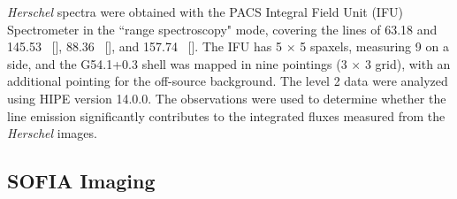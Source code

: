 \documentclass{emulateapj}
\newcommand{\spitzer}{\textit{Spitzer }}
\newcommand{\herschel}{\textit{Herschel }}
\begin{document}
\herschel spectra were obtained with the PACS Integral Field Unit (IFU) Spectrometer \citep{poglitsch10} in the ``range spectroscopy" mode, covering the lines of 63.18 and 145.53 \micron\ [], 88.36 \micron\ [], and 157.74 \micron\ []. The IFU has 5 $\times$ 5 spaxels, measuring 9 on a side, and the G54.1+0.3 shell was mapped in nine pointings (3 $\times$ 3 grid), with an additional pointing for the off-source background. The level 2 data were analyzed using HIPE version 14.0.0. The observations were used to determine whether the line emission significantly contributes to the integrated fluxes measured from the \herschel images.




\begin{figure*}
\center
{} 
\caption{\label{imgpanel}Imaging observations of the infrared shell in G54.1+0.3, including the AKARI 15 \micron, SOFIA 19.7, 25.3, 31.5, and 34.8 \micron, \spitzer MIPS 24 \micron \citep{temim10}, \herschel PACS 70, 100, and 160 \micron, and \herschel SPIRE 250, 350, and 500 \micron\ images. All images are shown on a linear color scale. The integrated background-subtracted flux densities of G54.1+0.3 are listed in Table~\ref{tab1}.}
\end{figure*}



\subsection{SOFIA Imaging} \label{sofia}
\end{document}
